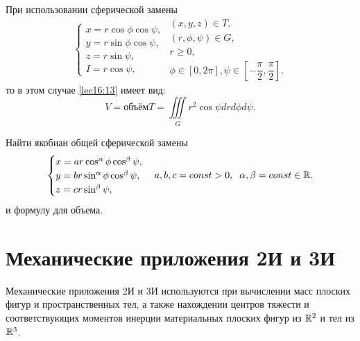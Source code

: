 \documentclass[../../main.tex]{subfiles}
\begin{document}
При использовании сферической замены
\begin{equation*}
	\begin{cases}
		x = r \cos \phi \cos \psi,\\
		y = r \sin \phi \cos \psi,\\
		z = r \sin \psi,\\
		I = r\cos \psi, 
	\end{cases}
	\begin{gathered}
		(x, y, z) \in T, \\
		(r, \phi, \psi) \in G,\\
		r\geq 0,\\
		\phi\in \left[0,2\pi\right],\psi\in\left[-\dfrac{\pi}2,\dfrac{\pi}2\right].
	\end{gathered}
\end{equation*}
то в этом случае \ref{lec16:13} имеет вид:
\begin{equation}
\label{lec16:14}
V = \text{объём} T = \iiint\limits_Gr^2\cos\psi dr d\phi d\psi.
\end{equation}
\begin{exercise}
	Найти якобиан общей сферической замены 
	\begin{equation*}
		\begin{cases}
			x = ar \cos^{\alpha}\phi \cos^{\beta}\psi,\\
			y = br \sin^{\alpha}\phi \cos^{\beta}\psi,\\
			z = cr \sin^{\beta}\psi,
		\end{cases}
		a, b, c =const>0, \;\; \alpha,\beta=const \in \mathbb{R}{}.
	\end{equation*}
и формулу для объема.
\end{exercise}

\section{Механические приложения 2И и 3И}
Механические приложения 2И и 3И используются при вычислении масс плоских фигур 
и пространственных тел, а также нахождении центров
тяжести и соответствующих моментов инерции материальных плоских фигур из 
$\mathbb{R}^2$ и тел из $\mathbb{R}^3$.
\end{document}
